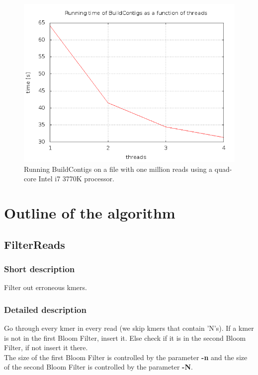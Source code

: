 \documentclass[a4paper]{report}
\renewcommand{\b}[1]{\textbf{#1}}  %
\begin{document}
\begin{figure}[h!]
\centering\includegraphics[scale=0.6]{graphs/threadtime_contigs1.png}
\caption{Running BuildContigs on a file with one million reads using a quad-core Intel i7 3770K processor.}
\label{contigtime1}
\end{figure}


\chapter{Outline of the algorithm}

\section{FilterReads}

\subsection{Short description}
Filter out erroneous kmers.

\subsection{Detailed description}
Go through every kmer in every read (we skip kmers that contain 'N's). If a kmer is not in the first Bloom Filter, insert it. Else check 
if it is in the second Bloom Filter, if not insert it there.\\[4pt]

The size of the first Bloom Filter is controlled by the parameter \b{-n} and the size of the second Bloom Filter
is controlled by the parameter \b{-N}.\\[4pt]
\end{document}
